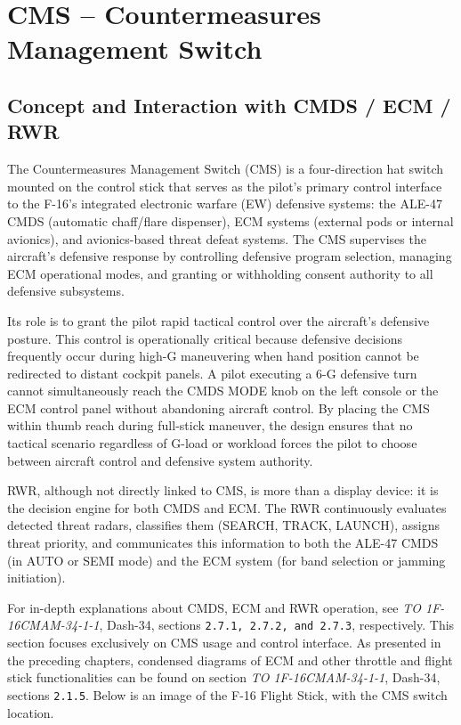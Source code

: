 \documentclass[11pt, a4paper, twoside]{report}
\providecommand{\dashrefs}[1]{\textit{TO 1F-16CMAM-34-1-1}, Dash-34, sections \texttt{#1}}
\begin{document}
\chapter{CMS -- Countermeasures Management Switch}
\label{chap:C5}

\section{Concept and Interaction with CMDS / ECM / RWR}\label{sec:C5-S1}

The Countermeasures Management Switch (CMS) is a four-direction hat switch mounted on the control stick that serves as the pilot's primary control interface to the F-16's integrated electronic warfare (EW) defensive systems: the ALE-47 CMDS (automatic chaff/flare dispenser), ECM systems (external pods or internal avionics), and avionics-based threat defeat systems. The CMS supervises the aircraft's defensive response by controlling defensive program selection, managing ECM operational modes, and granting or withholding consent authority to all defensive subsystems.

Its role is to grant the pilot rapid tactical control over the aircraft's defensive posture. This control is operationally critical because defensive decisions frequently occur during high-G maneuvering when hand position cannot be redirected to distant cockpit panels. A pilot executing a 6-G defensive turn cannot simultaneously reach the CMDS MODE knob on the left console or the ECM control panel without abandoning aircraft control. By placing the CMS within thumb reach during full-stick maneuver, the design ensures that no tactical scenario regardless of G-load or workload forces the pilot to choose between aircraft control and defensive system authority.

RWR, although not directly linked to CMS, is more than a display device: it is the decision engine for both CMDS and ECM. The RWR continuously evaluates detected threat radars, classifies them (SEARCH, TRACK, LAUNCH), assigns threat priority, and communicates this information to both the ALE-47 CMDS (in AUTO or SEMI mode) and the ECM system (for band selection or jamming initiation).

For in-depth explanations about CMDS, ECM and RWR operation, see \dashrefs{2.7.1, 2.7.2, and 2.7.3}, respectively. This section focuses exclusively on CMS usage and control interface. As presented in the preceding chapters, condensed diagrams of ECM and other throttle and flight stick functionalities can be found on section \dashrefs{2.1.5}. Below is an image of the F-16 Flight Stick, with the CMS switch location.
\end{document}
